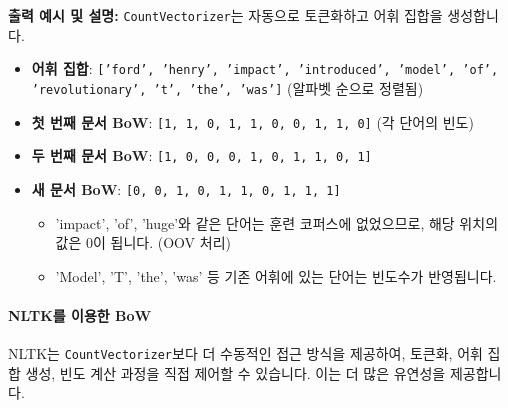 \documentclass[11pt,a4paper]{article}
\begin{document}
\begin{examplebox}
\textbf{출력 예시 및 설명:}
\texttt{CountVectorizer}는 자동으로 토큰화하고 어휘 집합을 생성합니다.
\begin{itemize}
    \item \textbf{어휘 집합}: \texttt{['ford', 'henry', 'impact', 'introduced', 'model', 'of', 'revolutionary', 't', 'the', 'was']} (알파벳 순으로 정렬됨)
    \item \textbf{첫 번째 문서 BoW}: \texttt{[1, 1, 0, 1, 1, 0, 0, 1, 1, 0]} (각 단어의 빈도)
    \item \textbf{두 번째 문서 BoW}: \texttt{[1, 0, 0, 0, 1, 0, 1, 1, 0, 1]}
    \item \textbf{새 문서 BoW}: \texttt{[0, 0, 1, 0, 1, 1, 0, 1, 1, 1]}
        \begin{itemize}
            \item 'impact', 'of', 'huge'와 같은 단어는 훈련 코퍼스에 없었으므로, 해당 위치의 값은 0이 됩니다. (OOV 처리)
            \item 'Model', 'T', 'the', 'was' 등 기존 어휘에 있는 단어는 빈도수가 반영됩니다.
        \end{itemize}
\end{itemize}
\end{examplebox}

\paragraph{NLTK를 이용한 BoW}
NLTK는 \texttt{CountVectorizer}보다 더 수동적인 접근 방식을 제공하여, 토큰화, 어휘 집합 생성, 빈도 계산 과정을 직접 제어할 수 있습니다. 이는 더 많은 유연성을 제공합니다.
\end{document}
